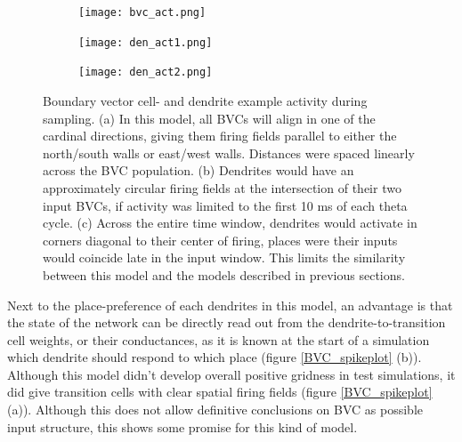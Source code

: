 \documentclass{article}
\begin{document}
    \begin{figure}[H]
        \begin{subfigure}{0.315\textwidth}
            \subcaption{}
            \texttt{[image: bvc\_act.png]}
        \end{subfigure}
        \hspace{0.02\textwidth}
        \begin{subfigure}{0.315\textwidth}
            \subcaption{}
            \texttt{[image: den\_act1.png]}
        \end{subfigure}
        \hspace{0.02\textwidth}
        \begin{subfigure}{0.315\textwidth}
            \subcaption{}
            \texttt{[image: den\_act2.png]}
        \end{subfigure}
        \caption{Boundary vector cell- and dendrite example activity during sampling. (a) In this model, all BVCs will align in one of the cardinal directions, giving them firing fields parallel to either the north/south walls or east/west walls. Distances were spaced linearly across the BVC population. (b) Dendrites would have an approximately circular firing fields at the intersection of their two input BVCs, if activity was limited to the first 10 ms of each theta cycle. (c) Across the entire time window, dendrites would activate in corners diagonal to their center of firing, places were their inputs would coincide late in the input window. This limits the similarity between this model and the models described in previous sections.}
        \label{BVC_input}
    \end{figure}
    
    Next to the place-preference of each dendrites in this model, an advantage is that the state of the network can be directly read out from the dendrite-to-transition cell weights, or their conductances, as it is known at the start of a simulation which dendrite should respond to which place (figure \ref{BVC_spikeplot} (b)). Although this model didn't develop overall positive gridness in test simulations, it did give transition cells with clear spatial firing fields (figure \ref{BVC_spikeplot} (a)). Although this does not allow definitive conclusions on BVC as possible input structure, this shows some promise for this kind of model. 
\end{document}
